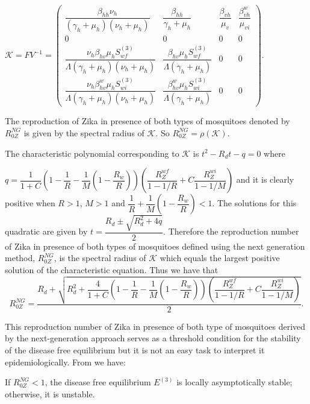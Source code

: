 \documentclass{ws-rv9x6}
\begin{document}
  \vspace{0.2in}
 $\mathcal{K}=FV^{-1}=\left(\begin{array}{cccc}
      \dfrac{\beta_{hh}\nu_h}{(\gamma_h+\mu_h)(\nu_h+\mu_h)} & \dfrac{\beta_{hh}}{\gamma_h+\mu_h} & \dfrac{\beta_{vh}}{\mu_v} & \dfrac{\beta^w_{vh}}{\mu_{vi}}  \\
      0& 0 & 0 & 0\\
      \dfrac{\nu_h\beta_{hv}\mu_hS^{(3)}_{wf}}{\Lambda(\gamma_h+\mu_h)(\nu_h+\mu_h)}& \dfrac{\beta_{hv}\mu_hS^{(3)}_{wf}}{\Lambda(\gamma_h+\mu_h)} & 0 &0\\
       \dfrac{\nu_h\beta^w_{hv}\mu_hS^{(3)}_{wi}}{\Lambda(\gamma_h+\mu_h)(\nu_h+\mu_h)}& \dfrac{\beta^w_{hv}\mu_hS^{(3)}_{wi}}{\Lambda(\gamma_h+\mu_h)} & 0 &0
 \end{array}\right).$\\
 
 \vspace{0.2in}
 
 \noindent The reproduction of Zika in presence of both types of mosquitoes denoted by $R_{0Z}^{NG}$ is given by the spectral radius of $\mathcal{K}$. So $R_{0Z}^{NG}=\rho(\mathcal{K}).$
 
 The characteristic polynomial corresponding to $\mathcal{K}$ is $t^2-R_dt-q=0$
where

 $q=\dfrac{1}{1+C}\left( 1-\dfrac{1}{R}-\dfrac{1}{M}\left(1-\dfrac{R_w}{R}\right)\right)\left(\dfrac{R^{wf}_Z}{1-1/R}+C\dfrac{R^{wi}_Z}{1-1/M}\right)$ and it is clearly positive when $R>1$, $M>1$ and $\dfrac{1}{R}+\dfrac{1}{M}\left(1-\dfrac{R_w}{R}\right)<1$. The solutions for this quadratic are given by $t=\dfrac{R_d \pm\sqrt{R_d^2+4q}}{2}$.
 Therefore the reproduction number of Zika in presence of both types of mosquitoes defined using the next generation method, $R_{0Z}^{NG}$, is the spectral radius of $\mathcal{K}$ which equals the largest positive solution of the characteristic equation. Thus we have that
 $$R_{0Z}^{NG}=\dfrac{R_d+\sqrt{R_d^2+\dfrac{4}{1+C}\left( 1-\dfrac{1}{R}-\dfrac{1}{M}\left(1-\dfrac{R_w}{R}\right)\right)\left(\dfrac{R^{wf}_Z}{1-1/R}+C\dfrac{R^{wi}_Z}{1-1/M}\right)}}{2}.$$
 
 
\noindent This reproduction number of Zika in presence of both type of mosquitoes derived by the next-generation approach serves as a threshold condition for the stability of the disease free equilibrium but it is not an easy task to interpret it epidemiologically. From \cite{van2002reproduction} we have:

\begin{theorem}
If $R_{0Z}^{NG}<1$, the disease free equilibrium $E^{(3)}$ is locally asymptotically stable; otherwise, it is unstable.
\end{theorem}
\end{document}

